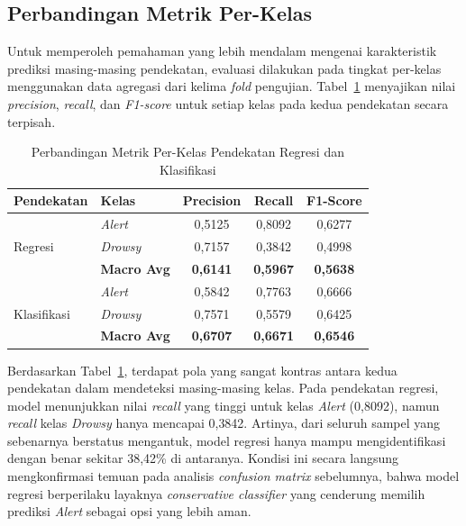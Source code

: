 \subsection{Perbandingan Metrik Per-Kelas}

Untuk memperoleh pemahaman yang lebih mendalam mengenai karakteristik prediksi masing-masing pendekatan, evaluasi dilakukan pada tingkat per-kelas menggunakan data agregasi dari kelima \textit{fold} pengujian. Tabel~\ref{tab:per_class_metrics} menyajikan nilai \textit{precision}, \textit{recall}, dan \textit{F1-score} untuk setiap kelas pada kedua pendekatan secara terpisah.

\begin{table}[H] %
\centering
\caption{Perbandingan Metrik Per-Kelas Pendekatan Regresi dan Klasifikasi}
\label{tab:per_class_metrics}
\renewcommand{\arraystretch}{1.2} %
\setlength{\tabcolsep}{10pt} %
\begin{tabular}{llccc}
\toprule
\textbf{Pendekatan} & \textbf{Kelas} & \textbf{Precision} & \textbf{Recall} & \textbf{F1-Score} \\
\midrule
\multirow{3}{*}{Regresi}
    & \textit{Alert}         & 0,5125 & 0,8092 & 0,6277 \\
    & \textit{Drowsy}        & 0,7157 & 0,3842 & 0,4998 \\ \cmidrule(lr){2-5}
    & \textbf{Macro Avg}     & \textbf{0,6141} & \textbf{0,5967} & \textbf{0,5638} \\
\midrule
\multirow{3}{*}{Klasifikasi}
    & \textit{Alert}         & 0,5842 & 0,7763 & 0,6666 \\
    & \textit{Drowsy}        & 0,7571 & 0,5579 & 0,6425 \\ \cmidrule(lr){2-5}
    & \textbf{Macro Avg}     & \textbf{0,6707} & \textbf{0,6671} & \textbf{0,6546} \\
\bottomrule
\end{tabular}
\end{table}

Berdasarkan Tabel~\ref{tab:per_class_metrics}, terdapat pola yang sangat kontras antara kedua pendekatan dalam mendeteksi masing-masing kelas. Pada pendekatan regresi, model menunjukkan nilai \textit{recall} yang tinggi untuk kelas \textit{Alert} (0{,}8092), namun \textit{recall} kelas \textit{Drowsy} hanya mencapai 0{,}3842. Artinya, dari seluruh sampel yang sebenarnya berstatus mengantuk, model regresi hanya mampu mengidentifikasi dengan benar sekitar 38,42\% di antaranya. Kondisi ini secara langsung mengkonfirmasi temuan pada analisis \textit{confusion matrix} sebelumnya, bahwa model regresi berperilaku layaknya \textit{conservative classifier} yang cenderung memilih prediksi \textit{Alert} sebagai opsi yang lebih aman.

